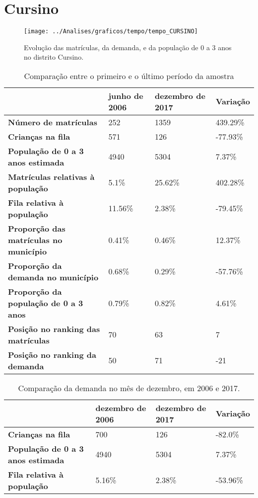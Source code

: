 \section{Cursino}
\begin{figure}[H]
\centering
\texttt{[image: ../Analises/graficos/tempo/tempo\_CURSINO]}
\caption{Evolução das matrículas, da demanda, e da população de 0 a 3 anos no distrito Cursino.}
\end{figure}
\begin{table}[H]
\begin{tabular}{|l|l|l|l|}
\hline
\textbf{}                                      & \textbf{junho de 2006}       & \textbf{dezembro de 2017}    & \textbf{Variação} \\ \hline
\textbf{Número de matrículas}                  & 252 & 1359 & 439.29\% \\ \hline
\textbf{Crianças na fila}                      & 571 & 126 & -77.93\% \\ \hline
\textbf{População de 0 a 3 anos estimada}      & 4940 & 5304 & 7.37\% \\ \hline
\textbf{Matrículas relativas à população}      & 5.1\% & 25.62\% & 402.28\% \\ \hline
\textbf{Fila relativa à população}             & 11.56\% & 2.38\% & -79.45\% \\ \hline
\textbf{Proporção das matrículas no município} & 0.41\% & 0.46\% & 12.37\% \\ \hline
\textbf{Proporção da demanda no município}     & 0.68\% & 0.29\% & -57.76\% \\ \hline
\textbf{Proporção da população de 0 a 3 anos}  & 0.79\% & 0.82\% & 4.61\% \\ \hline
\textbf{Posição no ranking das matrículas}     & 70 & 63 & 7 \\ \hline
\textbf{Posição no ranking da demanda}         & 50 & 71 & -21 \\ \hline
\end{tabular}
\caption{Comparação entre o primeiro e o último período da amostra}
\end{table}
\begin{table}[H]
\begin{tabular}{|l|l|l|l|}
\hline
\textbf{}                                 & \textbf{dezembro de 2006} & \textbf{dezembro de 2017} & \textbf{Variação} \\ \hline
\textbf{Crianças na fila}                      & 700 & 126 & -82.0\% \\ \hline
\textbf{População de 0 a 3 anos estimada}      & 4940 & 5304 & 7.37\% \\ \hline
\textbf{Fila relativa à população}             & 5.16\% & 2.38\% & -53.96\% \\ \hline
\end{tabular}
\caption{Comparação da demanda no mês de dezembro, em 2006 e 2017.}
\end{table}

